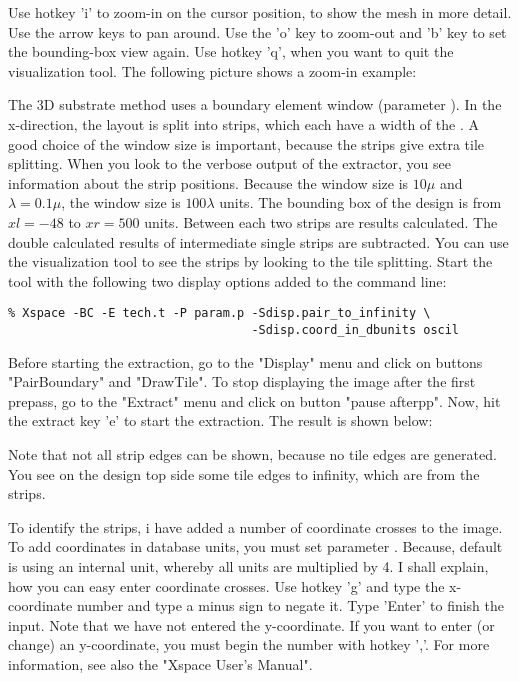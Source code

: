 \noindent
Use hotkey 'i' to zoom-in on the cursor position, to show the mesh in more detail.
Use the arrow keys to pan around.
Use the 'o' key to zoom-out and 'b' key to set the bounding-box view again.
Use hotkey 'q', when you want to quit the visualization tool.
The following picture shows a zoom-in example:
\begin{figure}[h]
\centerline{}
\end{figure}
\newpage
The 3D substrate method uses a boundary element window (parameter ).
In the x-direction, the layout is split into strips, which each have a width of the .
A good choice of the window size is important, because the strips give extra tile splitting.
When you look to the verbose output of the extractor, you see information about the strip positions.
Because the window size is $10 \mu$ and $\lambda = 0.1 \mu$, the window size is $100 \lambda$ units.
The bounding box of the design is from $xl = -48$ to $xr = 500$ units.
Between each two strips are results calculated.
The double calculated results of intermediate single strips are subtracted.
You can use the visualization tool to see the strips by looking to the tile splitting.
Start the tool with the following two display options added to the command line:
\small
\begin{Verbatim}
% Xspace -BC -E tech.t -P param.p -Sdisp.pair_to_infinity \
                                  -Sdisp.coord_in_dbunits oscil
\end{Verbatim}
\normalsize
Before starting the extraction,
go to the "Display" menu and click on buttons "PairBoundary" and "DrawTile".
To stop displaying the image after the first prepass,
go to the "Extract" menu and click on button "pause afterpp".
Now, hit the extract key 'e' to start the extraction.
The result is shown below:
\begin{figure}[h]
\centerline{}
\end{figure}

Note that not all strip edges can be shown, because no tile edges are generated.
You see on the design top side some tile edges to infinity, which are from the strips.

To identify the strips,
i have added a number of coordinate crosses to the image.
To add coordinates in database units, you must set parameter .
Because, default  is using an internal unit, whereby all units are multiplied by 4.
I shall explain, how you can easy enter coordinate crosses.
Use hotkey 'g' and type the x-coordinate number and type a minus sign to negate it.
Type 'Enter' to finish the input.
Note that we have not entered the y-coordinate.
If you want to enter (or change) an y-coordinate, you must begin the number with hotkey ','.
For more information, see also the "Xspace User's Manual".
